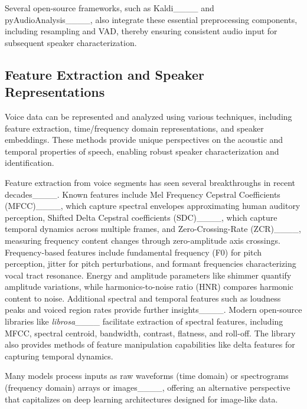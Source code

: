 Several open-source frameworks, such as Kaldi____ and pyAudioAnalysis____, also integrate these essential preprocessing components, including resampling and VAD, thereby ensuring consistent audio input for subsequent speaker
characterization.

\subsection{Feature Extraction and Speaker Representations}

Voice data can be represented and analyzed using various techniques, including feature extraction, time/frequency domain representations, and speaker embeddings. These methods provide unique perspectives on the acoustic and temporal properties of speech, enabling robust speaker characterization and identification.

Feature extraction from voice segments has seen several breakthroughs in recent decades____. Known features include Mel Frequency Cepstral Coefficients (MFCC)____, which capture spectral envelopes approximating human auditory perception, Shifted Delta Cepstral coefficients (SDC)____, which capture temporal dynamics across multiple frames, and Zero-Crossing-Rate (ZCR)____, measuring frequency content changes through zero-amplitude axis crossings. Frequency-based features include fundamental frequency (F0) for pitch perception, jitter for pitch perturbations, and formant frequencies characterizing vocal tract resonance. Energy and amplitude parameters like shimmer quantify amplitude variations, while harmonics-to-noise ratio (HNR) compares harmonic content to noise. Additional spectral and temporal features such as loudness peaks and voiced region rates provide further insights____. Modern open-source libraries like \textit{librosa}____ facilitate extraction of spectral features, including MFCC, spectral centroid, bandwidth, contrast, flatness, and roll-off. The library also provides methods of feature manipulation capabilities like delta features for capturing temporal dynamics. 

Many models process inputs as raw waveforms (time domain) or spectrograms (frequency domain) arrays or images____, offering an alternative perspective that capitalizes on deep learning architectures designed for image-like data.

